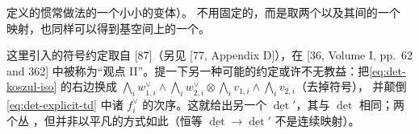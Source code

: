 \trStabilization{}定义\trDeterminantLine{}\trLineBundle{}的惯常做法的一个小小的变体）。
不用固定的\trBanachSpace，而是取两个\trBanach{}\trVectorBundle{}以及其间的一个%
\trFredholm{}映射，也同样可以得到基空间上的一个\trDeterminantLine{}\trLineBundle。
\begin{remark}\label{thm:det-sign-convention}
这里引入的符号约定取自 [87]（另见 [77, Appendix D]），在 [36, Volume I, pp.~62 and 362]
中被称为“观点 II”。提一下另一种可能的约定或许不无教益：把\eqref{eq:det-koszul-iso}
的右边换成
$\textstyle\bigwedge_i w^{\vee}_{1,i}\wedge\bigwedge_i w^{\vee}_{2,i}\otimes
\textstyle\bigwedge_i v_{1,i}\wedge\bigwedge_i v_{2,i}$（去掉符号），
并颠倒\eqref{eq:det-explicit-td} 中诸 $f_i^{\vee}$ 的次序。这就给出另一个%
\trLineBundle{} $\underline{\det}'$，其\trFiber{}与 $\underline{\det}$ 相同；两个丛%
\trIsomorphic，但并非以平凡的方式如此（恒等 $\underline{\det}\to\underline{\det}'$
不是连续映射）。
\end{remark}
